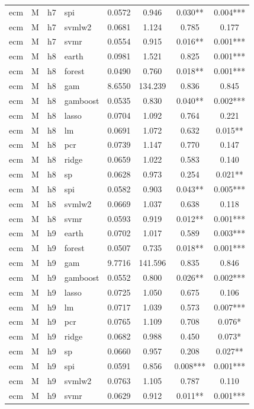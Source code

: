 \begin{ThreePartTable}
\begin{longtable}[t]{llclcccc}
ecm & M & h7 & spi & 0.0572 & 0.946 & 0.030** & 0.004***\\
ecm & M & h7 & svmlw2 & 0.0681 & 1.124 & 0.785 & 0.177\\
ecm & M & h7 & svmr & 0.0554 & 0.915 & 0.016** & 0.001***\\
\addlinespace
ecm & M & h8 & earth & 0.0981 & 1.521 & 0.825 & 0.001***\\
ecm & M & h8 & forest & 0.0490 & 0.760 & 0.018** & 0.001***\\
ecm & M & h8 & gam & 8.6550 & 134.239 & 0.836 & 0.845\\
ecm & M & h8 & gamboost & 0.0535 & 0.830 & 0.040** & 0.002***\\
ecm & M & h8 & lasso & 0.0704 & 1.092 & 0.764 & 0.221\\
ecm & M & h8 & lm & 0.0691 & 1.072 & 0.632 & 0.015**\\
ecm & M & h8 & pcr & 0.0739 & 1.147 & 0.770 & 0.147\\
ecm & M & h8 & ridge & 0.0659 & 1.022 & 0.583 & 0.140\\
ecm & M & h8 & sp & 0.0628 & 0.973 & 0.254 & 0.021**\\
ecm & M & h8 & spi & 0.0582 & 0.903 & 0.043** & 0.005***\\
ecm & M & h8 & svmlw2 & 0.0669 & 1.037 & 0.638 & 0.118\\
ecm & M & h8 & svmr & 0.0593 & 0.919 & 0.012** & 0.001***\\
\addlinespace
ecm & M & h9 & earth & 0.0702 & 1.017 & 0.589 & 0.003***\\
ecm & M & h9 & forest & 0.0507 & 0.735 & 0.018** & 0.001***\\
ecm & M & h9 & gam & 9.7716 & 141.596 & 0.835 & 0.846\\
ecm & M & h9 & gamboost & 0.0552 & 0.800 & 0.026** & 0.002***\\
ecm & M & h9 & lasso & 0.0725 & 1.050 & 0.675 & 0.106\\
ecm & M & h9 & lm & 0.0717 & 1.039 & 0.573 & 0.007***\\
ecm & M & h9 & pcr & 0.0765 & 1.109 & 0.708 & 0.076*\\
ecm & M & h9 & ridge & 0.0682 & 0.988 & 0.450 & 0.073*\\
ecm & M & h9 & sp & 0.0660 & 0.957 & 0.208 & 0.027**\\
ecm & M & h9 & spi & 0.0591 & 0.856 & 0.008*** & 0.001***\\
ecm & M & h9 & svmlw2 & 0.0763 & 1.105 & 0.787 & 0.110\\
ecm & M & h9 & svmr & 0.0629 & 0.912 & 0.011** & 0.001***\\

\end{longtable}
\end{ThreePartTable}
